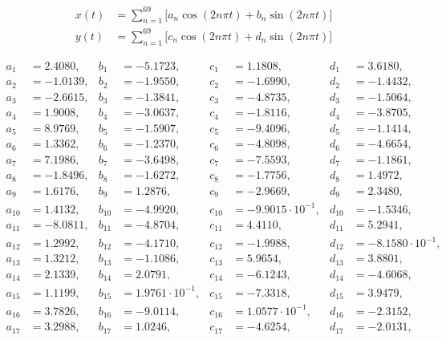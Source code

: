 \begin{align*}
x(t) &= \sum\limits_{n=1}^{ 69 } \Big[a_n \cos(2n\pi t) + b_n \sin(2n\pi t) \Big]\\ 
y(t) &= \sum\limits_{n=1}^{ 69 } \Big[c_n \cos(2n\pi t) + d_n \sin(2n\pi t) \Big]
\end{align*}

\begin{align*}
  a_{ 1 } &= 2.4080, & b_{ 1 } &= -5.1723, & c_{ 1 } &= 1.1808, & d_{ 1 } &= 3.6180, \\ 
  a_{ 2 } &= -1.0139, & b_{ 2 } &= -1.9550, & c_{ 2 } &= -1.6990, & d_{ 2 } &= -1.4432, \\ 
  a_{ 3 } &= -2.6615, & b_{ 3 } &= -1.3841, & c_{ 3 } &= -4.8735, & d_{ 3 } &= -1.5064, \\ 
  a_{ 4 } &= 1.9008, & b_{ 4 } &= -3.0637, & c_{ 4 } &= -1.8116, & d_{ 4 } &= -3.8705, \\ 
  a_{ 5 } &= 8.9769, & b_{ 5 } &= -1.5907, & c_{ 5 } &= -9.4096, & d_{ 5 } &= -1.1414, \\ 
  a_{ 6 } &= 1.3362, & b_{ 6 } &= -1.2370, & c_{ 6 } &= -4.8098, & d_{ 6 } &= -4.6654, \\ 
  a_{ 7 } &= 7.1986, & b_{ 7 } &= -3.6498, & c_{ 7 } &= -7.5593, & d_{ 7 } &= -1.1861, \\ 
  a_{ 8 } &= -1.8496, & b_{ 8 } &= -1.6272, & c_{ 8 } &= -1.7756, & d_{ 8 } &= 1.4972, \\ 
  a_{ 9 } &= 1.6176, & b_{ 9 } &= 1.2876, & c_{ 9 } &= -2.9669, & d_{ 9 } &= 2.3480, \\ 
  a_{ 10 } &= 1.4132, & b_{ 10 } &= -4.9920, & c_{ 10 } &= -9.9015 \cdot 10^{ -1 }, & d_{ 10 } &= -1.5346, \\ 
  a_{ 11 } &= -8.0811, & b_{ 11 } &= -4.8704, & c_{ 11 } &= 4.4110, & d_{ 11 } &= 5.2941, \\ 
  a_{ 12 } &= 1.2992, & b_{ 12 } &= -4.1710, & c_{ 12 } &= -1.9988, & d_{ 12 } &= -8.1580 \cdot 10^{ -1 }, \\ 
  a_{ 13 } &= 1.3212, & b_{ 13 } &= -1.1086, & c_{ 13 } &= 5.9654, & d_{ 13 } &= 3.8801, \\ 
  a_{ 14 } &= 2.1339, & b_{ 14 } &= 2.0791, & c_{ 14 } &= -6.1243, & d_{ 14 } &= -4.6068, \\ 
  a_{ 15 } &= 1.1199, & b_{ 15 } &= 1.9761 \cdot 10^{ -1 }, & c_{ 15 } &= -7.3318, & d_{ 15 } &= 3.9479, \\ 
  a_{ 16 } &= 3.7826, & b_{ 16 } &= -9.0114, & c_{ 16 } &= 1.0577 \cdot 10^{ -1 }, & d_{ 16 } &= -2.3152, \\ 
  a_{ 17 } &= 3.2988, & b_{ 17 } &= 1.0246, & c_{ 17 } &= -4.6254, & d_{ 17 } &= -2.0131, \\ 

\end{align*}
